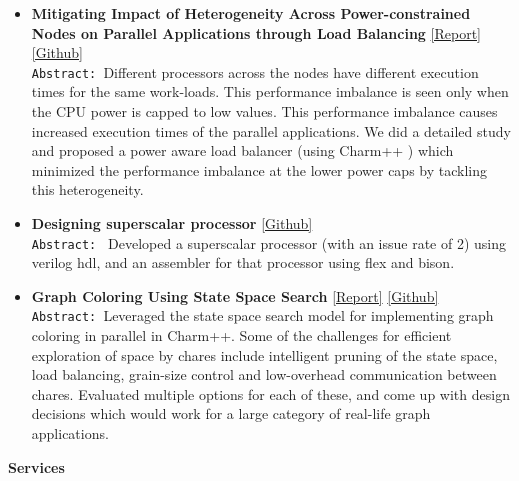 \documentclass[9pt]{article}
\newenvironment{changemargin}[2]{%
  \begin{list}{}{%
    \setlength{\topsep}{0pt}%
    \setlength{\leftmargin}{#1}%
    \setlength{\rightmargin}{#2}%
    \setlength{\listparindent}{\parindent}%
    \setlength{\itemindent}{\parindent}%
    \setlength{\parsep}{\parskip}%
  }%
  \item[]}{\end{list}
}
\newenvironment{body} {
	\vspace*{-16pt}
	\begin{changemargin}{-0.25in}{-0.5in}
  }	
	{\end{changemargin}
}
\begin{document}
\begin{body}
\begin{itemize}
          \item \textbf{Mitigating Impact of Heterogeneity Across Power-constrained Nodes on Parallel Applications through Load Balancing}     
                                \href{http://webhost.engr.illinois.edu/~sdasgup3/Document/report_cs533.pdf}{[Report]} 
                                \href{https://github.com/sdasgup3/heterogeneity-aware-load-balancing}{[Github]} \\
                                  \texttt{Abstract: }Different processors across the nodes
                                  have different execution times for the same
                                  work-loads. This performance imbalance is seen
                                  only when the CPU power is capped to low
                                  values. This performance imbalance causes
                                  increased execution times of the parallel
                                  applications. We did a detailed study and
                                  proposed a power aware load balancer (using
                                      Charm++ ) which minimized the performance
                                  imbalance at the lower power caps by tackling
                                  this heterogeneity.  
           \item \textbf{Designing superscalar processor} \href{https://github.com/sdasgup3/parallel-processor-design}{[Github]} \\
                                \texttt{Abstract: } Developed a superscalar processor (with  an
                                    issue rate of 2) using verilog hdl, and an
                                assembler for that processor using flex and
                                bison.  

           \item \textbf{Graph Coloring Using State Space Search} 
           \href{http://webhost.engr.illinois.edu/~sdasgup3/Document/CS598_project_proposal.pdf}{[Report]} 
           \href{https://github.com/sdasgup3/parallel-sudoku}{[Github]} \\          
                                  \texttt{Abstract: }Leveraged the state space
                                  search model for implementing graph coloring
                                  in parallel in Charm++. Some of the
                                  challenges for efficient exploration of space
                                  by chares include intelligent pruning of the
                                  state space, load balancing, grain-size
                                  control and low-overhead communication
                                  between chares. Evaluated multiple options
                                  for each of these, and come up with design
                                  decisions which would work for a large
                                  category of real-life graph applications.
	\end{itemize}
	\textbf{Services}{} \hfill  \\


\end{body}
\end{document}
